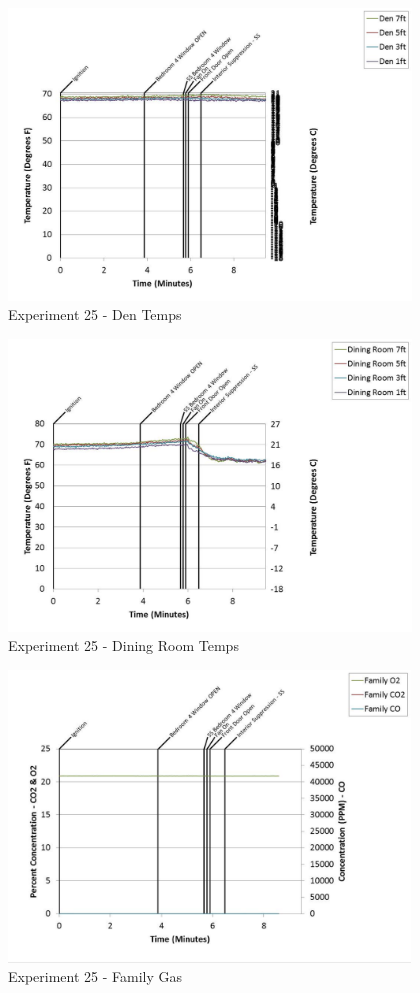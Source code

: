 \documentclass{article}
\begin{document}
\begin{appendices}
	\begin{figure}[h!]
		\centering
		\includegraphics[height=3.05in]{0_Images/Results_Charts/Exp_25_Charts/DenTemps.pdf}
		\caption{Experiment 25 - Den Temps}
	\end{figure}
 
	\clearpage

	\begin{figure}[h!]
		\centering
		\includegraphics[height=3.05in]{0_Images/Results_Charts/Exp_25_Charts/DiningRoomTemps.pdf}
		\caption{Experiment 25 - Dining Room Temps}
	\end{figure}
 

	\begin{figure}[h!]
		\centering
		\includegraphics[height=3.05in]{0_Images/Results_Charts/Exp_25_Charts/FamilyGas.pdf}
		\caption{Experiment 25 - Family Gas}
	\end{figure}
 

\end{appendices}
\end{document}
